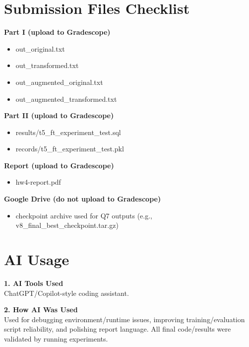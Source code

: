 \documentclass{article}
\begin{document}
\section*{Submission Files Checklist}
\textbf{Part I (upload to Gradescope)}
\begin{itemize}
  \item out\_original.txt
  \item out\_transformed.txt
  \item out\_augmented\_original.txt
  \item out\_augmented\_transformed.txt
\end{itemize}

\textbf{Part II (upload to Gradescope)}
\begin{itemize}
  \item results/t5\_ft\_experiment\_test.sql
  \item records/t5\_ft\_experiment\_test.pkl
\end{itemize}

\textbf{Report (upload to Gradescope)}
\begin{itemize}
  \item hw4-report.pdf
\end{itemize}

\textbf{Google Drive (do not upload to Gradescope)}
\begin{itemize}
  \item checkpoint archive used for Q7 outputs (e.g., v8\_final\_best\_checkpoint.tar.gz)
\end{itemize}

\section*{AI Usage}
\noindent\textbf{1. AI Tools Used}\\
ChatGPT/Copilot-style coding assistant.

\noindent\textbf{2. How AI Was Used}\\
Used for debugging environment/runtime issues, improving training/evaluation script reliability,
and polishing report language. All final code/results were validated by running experiments.
\end{document}
